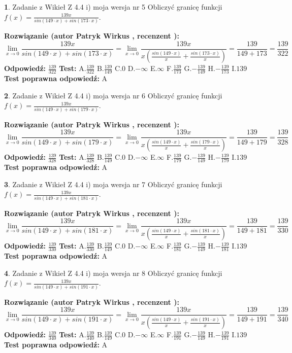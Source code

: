 \documentclass[12pt, a4paper]{article}
\theoremstyle{definition} %
\newtheorem{zad}{}
\newcommand{\zadStart}[1]{\begin{zad}#1\newline}
\newcommand{\zadStop}{\end{zad}}
\newcommand{\rozwStart}[2]{\noindent \textbf{Rozwiązanie (autor #1 , recenzent #2): }\newline}
\newcommand{\rozwStop}{\newline}
\newcommand{\odpStart}{\noindent \textbf{Odpowiedź:}\newline}
\newcommand{\odpStop}{\newline}
\newcommand{\testStart}{\noindent \textbf{Test:}\newline}
\newcommand{\testStop}{\newline}
\newcommand{\kluczStart}{\noindent \textbf{Test poprawna odpowiedź:}\newline}
\newcommand{\kluczStop}{\newline}
\begin{document}
\zadStart{Zadanie z Wikieł Z 4.4 i) moja wersja nr 5}
Obliczyć granicę funkcji $f(x)=\frac{139x}{sin(149\cdot x) +sin(173\cdot x)}$.
\zadStop
\rozwStart{Patryk Wirkus}{}
$$\lim\limits_{x\to 0}\frac{139x}{sin(149\cdot x) +sin(173\cdot x)}=\lim\limits_{x\to 0}\frac{139x}{x(\frac{sin(149\cdot x)}{x}+\frac{sin(173\cdot x)}{x})}=\frac{139}{149+173} = \frac{139}{322}$$
\rozwStop
\odpStart
$\frac{139}{322}$
\odpStop
\testStart
A.$\frac{139}{322}$
B.$\frac{139}{149}$
C.$0$
D.$-\infty$
E.$\infty$
F.$\frac{139}{173}$
G.$-\frac{139}{149}$
H.$-\frac{139}{173}$
I.$139$
\testStop
\kluczStart
A
\kluczStop



\zadStart{Zadanie z Wikieł Z 4.4 i) moja wersja nr 6}
Obliczyć granicę funkcji $f(x)=\frac{139x}{sin(149\cdot x) +sin(179\cdot x)}$.
\zadStop
\rozwStart{Patryk Wirkus}{}
$$\lim\limits_{x\to 0}\frac{139x}{sin(149\cdot x) +sin(179\cdot x)}=\lim\limits_{x\to 0}\frac{139x}{x(\frac{sin(149\cdot x)}{x}+\frac{sin(179\cdot x)}{x})}=\frac{139}{149+179} = \frac{139}{328}$$
\rozwStop
\odpStart
$\frac{139}{328}$
\odpStop
\testStart
A.$\frac{139}{328}$
B.$\frac{139}{149}$
C.$0$
D.$-\infty$
E.$\infty$
F.$\frac{139}{179}$
G.$-\frac{139}{149}$
H.$-\frac{139}{179}$
I.$139$
\testStop
\kluczStart
A
\kluczStop



\zadStart{Zadanie z Wikieł Z 4.4 i) moja wersja nr 7}
Obliczyć granicę funkcji $f(x)=\frac{139x}{sin(149\cdot x) +sin(181\cdot x)}$.
\zadStop
\rozwStart{Patryk Wirkus}{}
$$\lim\limits_{x\to 0}\frac{139x}{sin(149\cdot x) +sin(181\cdot x)}=\lim\limits_{x\to 0}\frac{139x}{x(\frac{sin(149\cdot x)}{x}+\frac{sin(181\cdot x)}{x})}=\frac{139}{149+181} = \frac{139}{330}$$
\rozwStop
\odpStart
$\frac{139}{330}$
\odpStop
\testStart
A.$\frac{139}{330}$
B.$\frac{139}{149}$
C.$0$
D.$-\infty$
E.$\infty$
F.$\frac{139}{181}$
G.$-\frac{139}{149}$
H.$-\frac{139}{181}$
I.$139$
\testStop
\kluczStart
A
\kluczStop



\zadStart{Zadanie z Wikieł Z 4.4 i) moja wersja nr 8}
Obliczyć granicę funkcji $f(x)=\frac{139x}{sin(149\cdot x) +sin(191\cdot x)}$.
\zadStop
\rozwStart{Patryk Wirkus}{}
$$\lim\limits_{x\to 0}\frac{139x}{sin(149\cdot x) +sin(191\cdot x)}=\lim\limits_{x\to 0}\frac{139x}{x(\frac{sin(149\cdot x)}{x}+\frac{sin(191\cdot x)}{x})}=\frac{139}{149+191} = \frac{139}{340}$$
\rozwStop
\odpStart
$\frac{139}{340}$
\odpStop
\testStart
A.$\frac{139}{340}$
B.$\frac{139}{149}$
C.$0$
D.$-\infty$
E.$\infty$
F.$\frac{139}{191}$
G.$-\frac{139}{149}$
H.$-\frac{139}{191}$
I.$139$
\testStop
\kluczStart
A
\kluczStop
\end{document}
